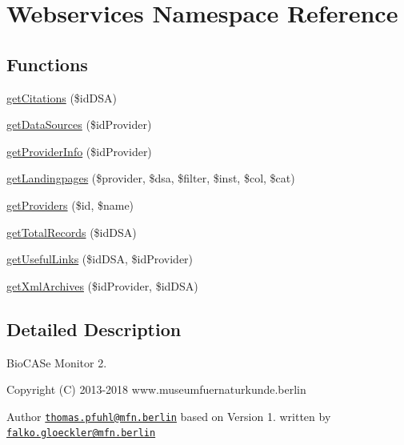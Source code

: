 \hypertarget{namespace_webservices}{}\section{Webservices Namespace Reference}
\label{namespace_webservices}
\subsection*{Functions}
\begin{DoxyCompactItemize}
\item 
\hyperlink{namespace_webservices_a4d1a72eadb36c3dbc90614be4c669e6d}{get\+Citations} (\$id\+D\+SA)
\item 
\hyperlink{namespace_webservices_a43ab3c5a3b6ac98afa231d961ffe33f9}{get\+Data\+Sources} (\$id\+Provider)
\item 
\hyperlink{namespace_webservices_a56703e6dd42e07b8734efeb0f2f7bd88}{get\+Provider\+Info} (\$id\+Provider)
\item 
\hyperlink{namespace_webservices_ad27d0dcb2a954ed5890f6c44c37e3d80}{get\+Landingpages} (\$provider, \$dsa, \$filter, \$inst, \$col, \$cat)
\item 
\hyperlink{namespace_webservices_a982728deb9ddc1d58b4496ef46159b73}{get\+Providers} (\$id, \$name)
\item 
\hyperlink{namespace_webservices_ac8ab1673965ee4402764681d199621d2}{get\+Total\+Records} (\$id\+D\+SA)
\item 
\hyperlink{namespace_webservices_ae993bcd484dd56a7995b75671c97c0ba}{get\+Useful\+Links} (\$id\+D\+SA, \$id\+Provider)
\item 
\hyperlink{namespace_webservices_a120cf6b05d30673945818b2e9dadcba4}{get\+Xml\+Archives} (\$id\+Provider, \$id\+D\+SA)
\end{DoxyCompactItemize}


\subsection{Detailed Description}
Bio\+C\+A\+Se Monitor 2. \begin{DoxyCopyright}{Copyright}
(C) 2013-\/2018 www.\+museumfuernaturkunde.\+berlin 
\end{DoxyCopyright}
\begin{DoxyAuthor}{Author}
\href{mailto:thomas.pfuhl@mfn.berlin}{\tt thomas.\+pfuhl@mfn.\+berlin} based on Version 1. written by \href{mailto:falko.gloeckler@mfn.berlin}{\tt falko.\+gloeckler@mfn.\+berlin} 
\end{DoxyAuthor}


